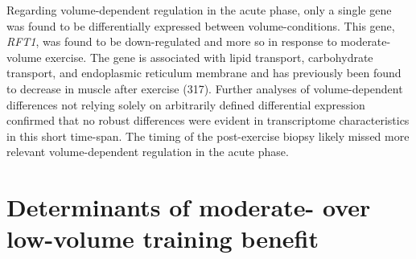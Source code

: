 \documentclass[twoside,10pt]{gihclass} %
\begin{document}
Regarding volume-dependent regulation in the acute phase, only a single gene was found to be differentially expressed between volume-conditions. This gene, \emph{RFT1}, was found to be down-regulated and more so in response to moderate-volume exercise. The gene is associated with lipid transport, carbohydrate transport, and endoplasmic reticulum membrane and has previously been found to decrease in muscle after exercise (317).
Further analyses of volume-dependent differences not relying solely on arbitrarily defined differential expression confirmed that no robust differences were evident in transcriptome characteristics in this short time-span.
The timing of the post-exercise biopsy likely missed more relevant volume-dependent regulation in the acute phase.

\hypertarget{determinants}{%
\section{Determinants of moderate- over low-volume training benefit}\label{determinants}}
\end{document}
